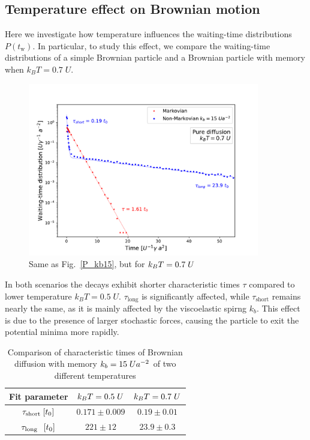 \subsection{Temperature effect on Brownian motion}
Here we investigate how temperature influences the waiting-time distributions $P(t_\text{w})$. In particular, to study this effect, we compare the waiting-time distributions of a simple Brownian particle and a Brownian particle with memory when $k_BT=0.7\; U$.
\begin{figure}[ht!]
    \centering
    \includegraphics[width=0.9\textwidth]{kb15_T07.pdf}
    \caption{Same as Fig.~\ref{P_kb15}, but for $k_BT = 0.7\hspace{0.1cm}U$}
    \label{fig:kb15_temp_high}
\end{figure}
In both scenarios the decays exhibit shorter characteristic times $\tau$ compared to lower temperature $k_BT=0.5\; U$. $\tau_\text{long}$ is significantly affected, while $\tau_\text{short}$ remains nearly the same, as it is mainly affected by the viscoelastic spirng $k_b$. This effect is due to the presence of larger stochastic forces, causing the particle to exit the potential minima more rapidly.
\begin{table}
\centering 
\begin{tabular}{ccc}
    \toprule
    Fit parameter & $k_BT = 0.5\hspace{0.1cm}U$ & $k_BT = 0.7\hspace{0.1cm}U$ \\
    \midrule
    $\tau_\text{short} \hspace{0.1cm} [t_0]$ & $0.171\pm 0.009$ & $0.19 \pm 0.01$\\[0.5ex]
    $\tau_\text{long} \hspace{0.25cm} [t_0]$ & $221 \pm 12$ & $23.9 \pm 0.3$\\[0.5ex]
    
    
    \bottomrule
\end{tabular}
\caption{Comparison of characteristic times of Brownian diffusion with memory $k_b=15\hspace{0.1cm}Ua^{-2}$ of two different temperatures}
\label{tab:variando_kbt}
\end{table}
\clearpage

